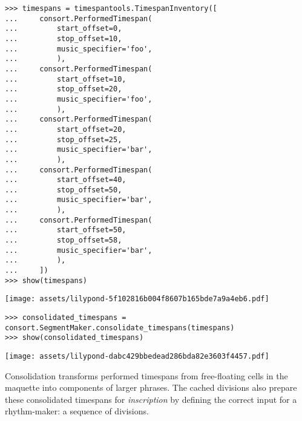 \begin{abjadbookoutput}
\begin{singlespacing}
\vspace{-0.5\baselineskip}
\begin{lstlisting}
>>> timespans = timespantools.TimespanInventory([
...     consort.PerformedTimespan(
...         start_offset=0,
...         stop_offset=10,
...         music_specifier='foo',
...         ),
...     consort.PerformedTimespan(
...         start_offset=10,
...         stop_offset=20,
...         music_specifier='foo',
...         ),
...     consort.PerformedTimespan(
...         start_offset=20,
...         stop_offset=25,
...         music_specifier='bar',
...         ),
...     consort.PerformedTimespan(
...         start_offset=40,
...         stop_offset=50,
...         music_specifier='bar',
...         ),
...     consort.PerformedTimespan(
...         start_offset=50,
...         stop_offset=58,
...         music_specifier='bar',
...         ),
...     ])
>>> show(timespans)
\end{lstlisting}
\noindent\texttt{[image: assets/lilypond-5f102816b004f8607b165bde7a9a4eb6.pdf]}
\begin{lstlisting}
>>> consolidated_timespans = consort.SegmentMaker.consolidate_timespans(timespans)
>>> show(consolidated_timespans)
\end{lstlisting}
\noindent\texttt{[image: assets/lilypond-dabc429bbedead286bda82e3603f4457.pdf]}
\end{singlespacing}
\end{abjadbookoutput}

\noindent Consolidation transforms performed timespans from free-floating cells
in the maquette into components of larger phrases. The cached divisions also
prepare these consolidated timespans for \emph{inscription} by defining the
correct input for a rhythm-maker: a sequence of divisions.

\begin{comment}
<abjad>
print(format(consolidated_timespans))
</abjad>
\end{comment}

